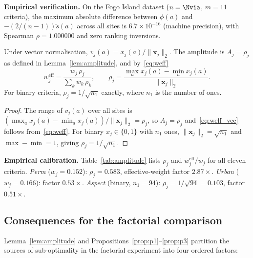 \noindent\textbf{Empirical verification.}
On the Fogo Island dataset ($n = \Nvia$, $m = 11$ criteria), the
maximum absolute difference between $\phi(a)$ and
$-(2/(n-1))\tilde{s}(a)$ across all sites is $6.7 \times 10^{-16}$
(machine precision), with Spearman $\rho = 1.000000$ and zero ranking
inversions.



\begin{proposition}
\label{prop:p3}
Under vector normalisation, $v_j(a) = x_j(a) / \lVert\mathbf{x}_j\rVert_2$.
The amplitude is $A_j = \rho_j$ as defined in
Lemma~\ref{lem:amplitude}, and by~\eqref{eq:weff}
\begin{equation}
  \label{eq:weff_vec}
  w_j^{\mathrm{eff}} = \frac{w_j\,\rho_j}{\sum_k w_k\,\rho_k},
  \qquad
  \rho_j = \frac{\max_a x_j(a) - \min_a x_j(a)}
                {\lVert\mathbf{x}_j\rVert_2}.
\end{equation}
For binary criteria, $\rho_j = 1/\sqrt{n_1}$ exactly, where $n_1$ is
the number of ones.
\end{proposition}

\begin{proof}
The range of $v_j(a)$ over all sites is
$(\max_a x_j(a) - \min_a x_j(a)) / \lVert\mathbf{x}_j\rVert_2 = \rho_j$,
so $A_j = \rho_j$ and~\eqref{eq:weff_vec} follows from~\eqref{eq:weff}.
For binary $x_j \in \{0,1\}$ with $n_1$ ones,
$\lVert\mathbf{x}_j\rVert_2 = \sqrt{n_1}$ and
$\max - \min = 1$, giving $\rho_j = 1/\sqrt{n_1}$.
\end{proof}

\noindent\textbf{Empirical calibration.}
Table~\ref{tab:amplitude} lists $\rho_j$ and $w_j^{\mathrm{eff}}/w_j$
for all eleven criteria.
\textit{Perm} ($w_j = 0.152$): $\rho_j = 0.583$, effective-weight
factor $\mathbf{2.87\times}$.
\textit{Urban} ($w_j = 0.166$): factor $\mathbf{0.53\times}$.
\textit{Aspect} (binary, $n_1 = 94$): $\rho_j = 1/\sqrt{94} = 0.103$,
factor $0.51\times$.


\subsection{Consequences for the factorial comparison}
\label{sec:consequences}

Lemma~\ref{lem:amplitude} and
Propositions~\ref{prop:p1}--\ref{prop:p3} partition the sources of
sub-optimality in the factorial experiment into four ordered factors:

